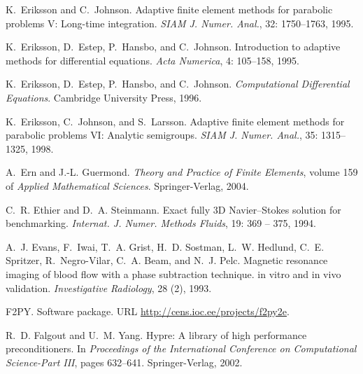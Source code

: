 \begin{thebibliography}{467}
K.~Eriksson and C.~Johnson.
\newblock Adaptive finite element methods for parabolic problems {V}:
  {L}ong-time integration.
\newblock \emph{SIAM J. Numer. Anal.}, 32: 1750--1763,
  1995{}.

K.~Eriksson, D.~Estep, P.~Hansbo, and C.~Johnson.
\newblock Introduction to adaptive methods for differential equations.
\newblock \emph{Acta Numerica}, 4: 105--158, 1995.

K.~Eriksson, D.~Estep, P.~Hansbo, and C.~Johnson.
\newblock \emph{Computational Differential Equations}.
\newblock Cambridge University Press, 1996.

K.~Eriksson, C.~Johnson, and S.~Larsson.
\newblock Adaptive finite element methods for parabolic problems {VI}:
  {A}nalytic semigroups.
\newblock \emph{SIAM J. Numer. Anal.}, 35: 1315--1325, 1998.

A.~Ern and J.-L. Guermond.
\newblock \emph{Theory and Practice of Finite Elements}, volume 159 of
  \emph{Applied Mathematical Sciences}.
\newblock Springer-Verlag, 2004.

C.~R. Ethier and D.~A. Steinmann.
\newblock Exact fully {3D} {N}avier--{S}tokes solution for benchmarking.
\newblock \emph{Internat. J. Numer. Methods Fluids}, 19: 369 -- 375,
  1994.

A.~J. Evans, F.~Iwai, T.~A. Grist, H.~D. Sostman, L.~W. Hedlund, C.~E.
  Spritzer, R.~Negro-Vilar, C.~A. Beam, and N.~J. Pelc.
\newblock Magnetic resonance imaging of blood flow with a phase subtraction
  technique. in vitro and in vivo validation.
\newblock \emph{Investigative Radiology}, 28 (2), 1993.

{F2PY}.
\newblock Software package.
\newblock URL \url{http://cens.ioc.ee/projects/f2py2e}.

R.~D. Falgout and U.~M. Yang.
\newblock Hypre: {A} library of high performance preconditioners.
\newblock In \emph{Proceedings of the International Conference on Computational
  Science-Part III}, pages 632--641. Springer-Verlag, 2002.


\end{thebibliography}
